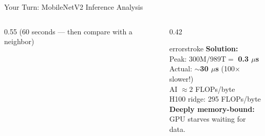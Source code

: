 \documentclass[aspectratio=169, 12pt]{beamer}
\begin{document}
\begin{frame}{Your Turn: MobileNetV2 Inference Analysis}
\begin{columns}[T]
\begin{column}{0.55\textwidth}
    {\footnotesize\textcolor{midgray}{(60 seconds --- then compare with a neighbor)}}
  \end{column}
  \begin{column}{0.42\textwidth}
    \pause
    \begin{mlsyscard}{errorstroke}
    \textbf{Solution:}\\[0.05cm]
    {\footnotesize
    Peak: $300\text{M} / 989\text{T} = $ \textbf{0.3 $\mu$s}\\
    Actual: $\sim$\textbf{30 $\mu$s} (100$\times$ slower!)\\[0.05cm]
    AI $\approx 2$ FLOPs/byte\\
    H100 ridge: 295 FLOPs/byte\\[0.05cm]
    \textcolor{errorstroke}{\textbf{Deeply memory-bound:}}\\
    GPU starves waiting for data.
    }
    \end{mlsyscard}
  \end{column}
\end{columns}

\end{frame}
\end{document}
